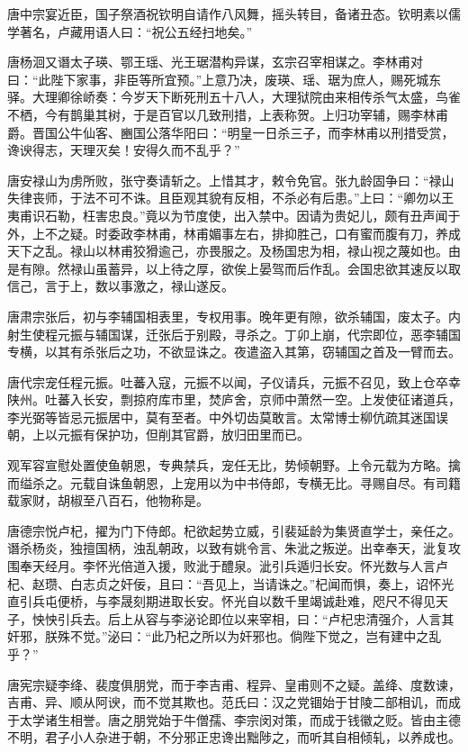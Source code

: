 \documentclass[a4paper,12pt,UTF8,twoside]{ctexbook}
\begin{document}
    唐中宗宴近臣，国子祭酒祝钦明自请作八风舞，摇头转目，备诸丑态。钦明素以儒学著名，卢藏用语人曰：“祝公五经扫地矣。”
    
    唐杨洄又谮太子瑛、鄂王瑶、光王琚潜构异谋，玄宗召宰相谋之。李林甫对曰：“此陛下家事，非臣等所宜预。”上意乃决，废瑛、瑶、琚为庶人，赐死城东驿。大理卿徐峤奏：今岁天下断死刑五十八人，大理狱院由来相传杀气太盛，鸟雀不栖，今有鹊巢其树，于是百官以几致刑措，上表称贺。上归功宰辅，赐李林甫爵。晋国公牛仙客、豳国公落华阳曰：“明皇一日杀三子，而李林甫以刑措受赏，谗谀得志，天理灭矣！安得久而不乱乎？”
    
    唐安禄山为虏所败，张守奏请斩之。上惜其才，敕令免官。张九龄固争曰：“禄山失律丧师，于法不可不诛。且臣观其貌有反相，不杀必有后患。”上曰：“卿勿以王夷甫识石勒，枉害忠良。”竟以为节度使，出入禁中。因请为贵妃儿，颇有丑声闻于外，上不之疑。时委政李林甫，林甫媚事左右，排抑胜己，口有蜜而腹有刀，养成天下之乱。禄山以林甫狡猾逾己，亦畏服之。及杨国忠为相，禄山视之蔑如也。由是有隙。然禄山虽蓄异，以上待之厚，欲俟上晏驾而后作乱。会国忠欲其速反以取信己，言于上，数以事激之，禄山遂反。
    
    唐肃宗张后，初与李辅国相表里，专权用事。晚年更有隙，欲杀辅国，废太子。内射生使程元振与辅国谋，迁张后于别殿，寻杀之。丁卯上崩，代宗即位，恶李辅国专横，以其有杀张后之功，不欲显诛之。夜遣盗入其第，窃辅国之首及一臂而去。
    
    唐代宗宠任程元振。吐蕃入寇，元振不以闻，子仪请兵，元振不召见，致上仓卒幸陕州。吐蕃入长安，剽掠府库市里，焚庐舍，京师中萧然一空。上发使征诸道兵，李光弼等皆忌元振居中，莫有至者。中外切齿莫敢言。太常博士柳伉疏其迷国误朝，上以元振有保护功，但削其官爵，放归田里而已。
    
    观军容宣慰处置使鱼朝恩，专典禁兵，宠任无比，势倾朝野。上令元载为方略。擒而缢杀之。元载自诛鱼朝恩，上宠用以为中书侍郎，专横无比。寻赐自尽。有司籍载家财，胡椒至八百石，他物称是。
    
    唐德宗悦卢杞，擢为门下侍郎。杞欲起势立威，引裴延龄为集贤直学士，亲任之。谮杀杨炎，独擅国柄，浊乱朝政，以致有姚令言、朱泚之叛逆。出幸奉天，泚复攻围奉天经月。李怀光倍道入援，败泚于醴泉。泚引兵遁归长安。怀光数与人言卢杞、赵瓒、白志贞之奸佞，且曰：“吾见上，当请诛之。”杞闻而惧，奏上，诏怀光直引兵屯便桥，与李晟刻期进取长安。怀光自以数千里竭诚赴难，咫尺不得见天子，怏怏引兵去。后上从容与李泌论即位以来宰相，曰：“卢杞忠清强介，人言其奸邪，朕殊不觉。”泌曰：“此乃杞之所以为奸邪也。倘陛下觉之，岂有建中之乱乎？”
    
    唐宪宗疑李绛、裴度俱朋党，而于李吉甫、程异、皇甫则不之疑。盖绛、度数谏，吉甫、异、顺从阿谀，而不觉其欺也。范氏曰：汉之党锢始于甘陵二部相讥，而成于太学诸生相誉。唐之朋党始于牛僧孺、李宗闵对策，而成于钱徽之贬。皆由主德不明，君子小人杂进于朝，不分邪正忠谗出黜陟之，而听其自相倾轧，以养成也。
    
\end{document}
